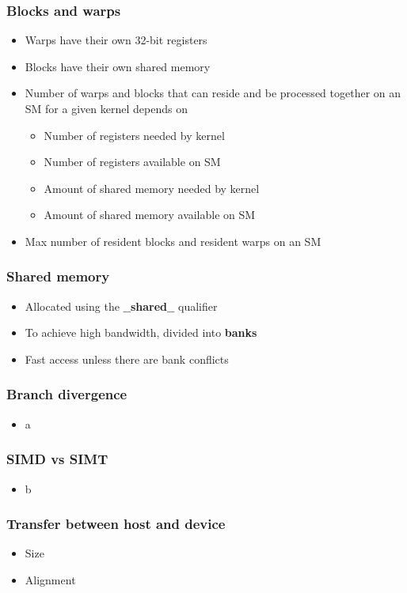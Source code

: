 \begin{frame}\frametitle{Blocks and warps}\logoEvolution\mypagenum
	\begin{itemize}
		\item Warps have their own 32-bit registers
		\item Blocks have their own shared memory
		\item Number of warps and blocks that can reside and be processed together on an SM for a given kernel depends on
		\begin{itemize}
			\item Number of registers needed by kernel
			\item Number of registers available on SM
			\item Amount of shared memory needed by kernel
			\item Amount of shared memory available on SM
		\end{itemize}
		\item Max number of resident blocks and resident warps on an SM
	\end{itemize}
\end{frame}


\begin{frame}\frametitle{Shared memory}\logoEvolution\mypagenum
	\begin{itemize}
		\item Allocated using the $\_\_$\textbf{shared}$\_\_$ qualifier
		\item To achieve high bandwidth, divided into \textbf{banks}
		\item Fast access unless there are bank conflicts
	\end{itemize}
\end{frame}


\begin{frame}\frametitle{Branch divergence}\logoEvolution\mypagenum
	\begin{itemize}
		\item a
	\end{itemize}
\end{frame}


\begin{frame}\frametitle{SIMD vs SIMT}\logoEvolution\mypagenum
	\begin{itemize}
		\item b
	\end{itemize}
\end{frame}


\begin{frame}\frametitle{Transfer between host and device}\logoEvolution\mypagenum
	\begin{itemize}
		\item Size
		\item Alignment
	\end{itemize}
\end{frame}



